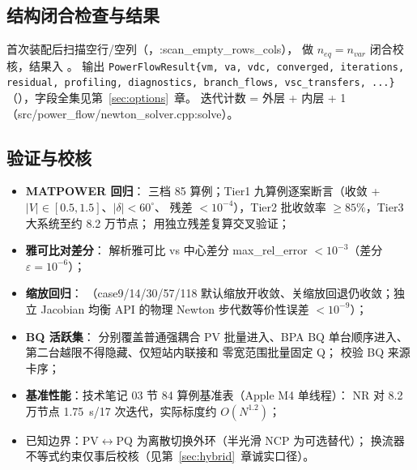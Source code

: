 \subsection{结构闭合检查与结果}
首次装配后扫描空行/空列（，:scan\_empty\_rows\_cols），
做 $n_{eq}=n_{var}$ 闭合校核，结果入 。
输出 \texttt{PowerFlowResult\{vm, va, vdc, converged, iterations, residual,
profiling, diagnostics, branch\_flows, vsc\_transfers, ...\}}
（），字段全集见第~\ref{sec:options}~章。
迭代计数  = 外层 + 内层 + 1（src/power\_flow/newton\_solver.cpp:solve）。

\subsection{验证与校核}
\begin{itemize}
  \item \textbf{MATPOWER 回归}： 三档
        85 算例；Tier1 九算例逐案断言（收敛 + $|V|\in[0.5,1.5]$、$|\delta|<60^\circ$、
        残差 $<10^{-4}$），Tier2 批收敛率 $\ge 85\%$，Tier3 大系统至约 8.2 万节点；
         用独立残差复算交叉验证；
  \item \textbf{雅可比对差分}：
        解析雅可比 vs 中心差分 max\_rel\_error $<10^{-3}$（差分 $\varepsilon=10^{-6}$）；
  \item \textbf{缩放回归}：
        （case9/14/30/57/118 默认缩放开收敛、关缩放回退仍收敛；独立 Jacobian
        均衡 API 的物理 Newton 步代数等价性误差 $<10^{-9}$）；
  \item \textbf{BQ 活跃集}： 分别覆盖普通强耦合
        PV 批量进入、BPA BQ 单台顺序进入、第二台越限不得隐藏、仅短站内联接和
        零宽范围批量固定 Q； 校验 BQ 来源卡序；
  \item \textbf{基准性能}：技术笔记 03 节 84 算例基准表（Apple M4 单线程）：
        NR 对 8.2 万节点 1.75~s/17 次迭代，实际标度约 $O(N^{1.2})$；
  \item 已知边界：PV$\leftrightarrow$PQ 为离散切换外环（半光滑 NCP 为可选替代）；
        换流器不等式约束仅事后校核（见第~\ref{sec:hybrid}~章诚实口径）。
\end{itemize}
